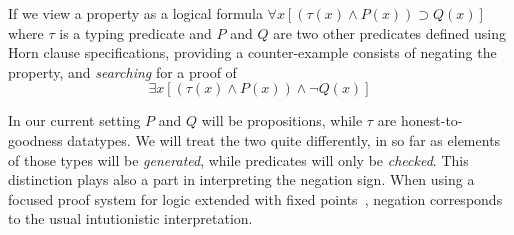 If we view  a property as a logical formula
\(\forall x [(\tau(x)\wedge P(x)) \supset Q(x)]\) where $\tau$ is a
typing predicate and $P$ and $Q$ are two other predicates defined
using Horn clause specifications, providing a counter-example
consists of  negating the property, and \emph{searching} for a proof of
\[
  \exists x [(\tau(x)\wedge P(x)) \wedge \neg Q(x)]
  \tag{*}\label{eq:full}
\]

In our current setting $P$ and $Q$ will be  propositions, while $\tau$   are honest-to-goodness datatypes. We will treat the two quite differently, in so far as elements of those types will be \emph{generated}, while predicates will only be \emph{checked}. This distinction plays also a part in interpreting the negation sign.
%
When using a focused proof system for logic extended with fixed
points~\cite{baelde12tocl}, negation corresponds to the usual intutionistic interpretation.  %

